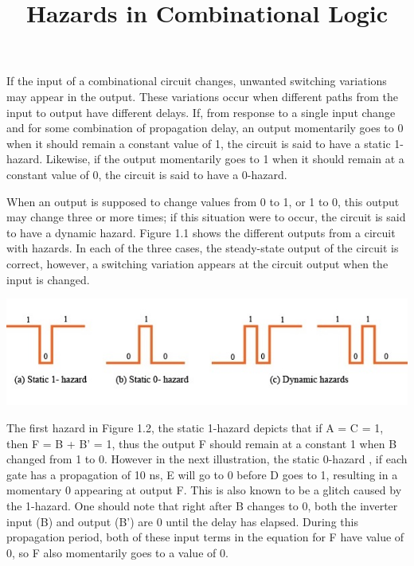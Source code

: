 \documentclass[12pt]{article}
\begin{document}
\title{Hazards in Combinational Logic}
\maketitle

If the input of a combinational circuit changes, unwanted switching variations may appear in the output. These variations occur when different paths from the input to output have different delays. If, from response to a single input change and for some combination of propagation delay, an output momentarily goes to 0 when it should remain a constant value of 1, the circuit is said to have a static 1-hazard. Likewise, if the output momentarily goes to 1 when it should remain at a constant value of 0, the circuit is said to have a 0-hazard.

When an output is supposed to change values from 0 to 1, or 1 to 0, this output may change three or more times; if this situation were to occur, the circuit is said to have a dynamic hazard. Figure 1.1 shows the different outputs from a circuit with hazards. In each of the three cases, the steady-state output of the circuit is correct, however, a switching variation appears at the circuit output when the input is changed. 



\begin{center}
	\includegraphics[scale=0.8]{./Static-and-dynamic-hazards-1.jpg}
\end{center}

The first hazard in Figure 1.2, the static 1-hazard depicts that if A = C = 1, then F = B + B'  = 1, thus the output F should remain at a constant 1 when B changed from 1 to 0. However in the next illustration, the static 0-hazard , if each gate has a propagation of 10 ns, E will go to 0 before D goes to 1, resulting in a momentary 0 appearing at output F. This is also known to be a glitch caused by the 1-hazard. One should note that right after B changes to 0, both the inverter input (B) and output (B') are 0 until the delay has elapsed. During this propagation period, both of these input terms in the equation for F have value of 0, so F also momentarily goes to a value of 0.
\end{document}
